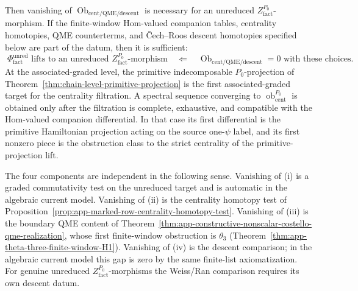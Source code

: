 \begin{thm}
  Then vanishing of
  \(\operatorname{Ob}_{\mathrm{cent}/\mathrm{QME}/\mathrm{descent}}\)
  is necessary for an unreduced
  \(Z^{P_0}_{\mathrm{fact}}\)-morphism.  If the finite-window
  Hom-valued companion tables, centrality homotopies, QME
  counterterms, and Čech--Roos descent homotopies specified below are
  part of the datum, then it is sufficient:
  \[
    \boxed{\;\Phi_{\mathrm{fact}}^{\mathrm{unred}}
      \text{ lifts to an unreduced }
      Z^{P_0}_{\mathrm{fact}}\text{-morphism}
      \quad\Longleftarrow\quad
      \operatorname{Ob}_{\mathrm{cent}/\mathrm{QME}/\mathrm{descent}}
      =0
      \text{ with these choices.}\;}
  \]
  At the associated-graded level, the primitive
  indecomposable \(P_0\)-projection of
  Theorem~\ref{thm:chain-level-primitive-projection}
  is the first associated-graded target for the centrality filtration.
  A spectral sequence converging to
  \(\operatorname{ob}^{P_0}_{\mathrm{cent}}\) is obtained only after the
  filtration is complete, exhaustive, and compatible with the
  Hom-valued companion differential.  In that case its first
  differential is the primitive Hamiltonian projection
  acting on the source one-\(\psi\) label, and its first nonzero
  piece is the obstruction class to the strict centrality of the
  primitive-projection lift.

  The four components are independent in the following sense.
  Vanishing of (i) is a graded commutativity test on the unreduced
  target and is automatic in the algebraic current model.  Vanishing
  of (ii) is the centrality homotopy test of
  Proposition~\ref{prop:app-marked-row-centrality-homotopy-test}.
  Vanishing of (iii) is the boundary QME content of
  Theorem~\ref{thm:app-constructive-nonscalar-costello-qme-realization},
  whose first finite-window obstruction is
  \(\theta_3\)
  (Theorem~\ref{thm:app-theta-three-finite-window-H1}).
  Vanishing of (iv) is the descent comparison; in the algebraic
  current model this gap is zero by the same finite-list
  axiomatization.  For genuine unreduced
  \(Z^{P_0}_{\mathrm{fact}}\)-morphisms the Weiss/Ran comparison
  requires its own descent datum.
\end{thm}


